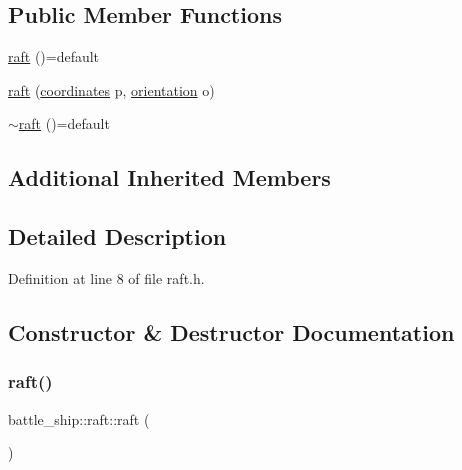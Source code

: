 \subsection*{Public Member Functions}
\begin{DoxyCompactItemize}
\item 
\hyperlink{classbattle__ship_1_1raft_acde3f010cdf8cb639c6c9996c4a31656}{raft} ()=default
\item 
\hyperlink{classbattle__ship_1_1raft_ab76a787da1c470907eb7e166af6e0db8}{raft} (\hyperlink{structbattle__ship_1_1coordinates}{coordinates} p, \hyperlink{namespacebattle__ship_aed87488f0a73f0d0679fe343fb61c784}{orientation} o)
\item 
\hyperlink{classbattle__ship_1_1raft_a4b381ef568f95e3fe097eeef75d2ac51}{$\sim$raft} ()=default
\end{DoxyCompactItemize}
\subsection*{Additional Inherited Members}


\subsection{Detailed Description}


Definition at line 8 of file raft.\+h.



\subsection{Constructor \& Destructor Documentation}
\mbox{\label{classbattle__ship_1_1raft_acde3f010cdf8cb639c6c9996c4a31656}} 
\subsubsection{\texorpdfstring{raft()}{raft()}\hspace{0.1cm}{\footnotesize\ttfamily [1/2]}}
{\footnotesize\ttfamily battle\+\_\+ship\+::raft\+::raft (\begin{DoxyParamCaption}{ }\end{DoxyParamCaption})\hspace{0.3cm}{\ttfamily [default]}}

\mbox{\label{classbattle__ship_1_1raft_ab76a787da1c470907eb7e166af6e0db8}} 
